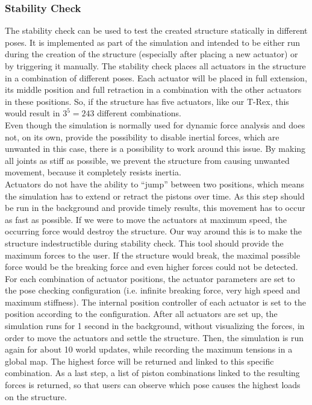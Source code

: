 \subsubsection{Stability Check}
The stability check can be used to test the created structure statically in different poses. It is implemented as part of the simulation and intended to be either run during the creation of the structure (especially after placing a new actuator) or by triggering it manually. The stability check places all actuators in the structure in a combination of different poses. Each actuator will be placed in full extension, its middle position and full retraction in a combination with the other actuators in these positions. So, if the structure has five actuators, like our T-Rex, this would result in $3 ^ 5 = 243$ different combinations.\\
Even though the simulation is normally used for dynamic force analysis and does not, on its own, provide the possibility to disable inertial forces, which are unwanted in this case, there is a possibility to work around this issue. By making all joints as stiff as possible, we prevent the structure from causing unwanted movement, because it completely resists inertia.\\
Actuators do not have the ability to ``jump'' between two positions, which means the simulation has to extend or retract the pistons over time. As this step should be run in the background and provide timely results, this movement has to occur as fast as possible. If we were to move the actuators at maximum speed, the occurring force would destroy the structure. Our way around this is to make the structure indestructible during stability check. This tool should provide the maximum forces to the user. If the structure would break, the maximal possible force would be the breaking force and even higher forces could not be detected.\\
For each combination of actuator positions, the actuator parameters are set to the pose checking configuration (i.e. infinite breaking force, very high speed and maximum stiffness). The internal position controller of each actuator is set to the position according to the configuration. After all actuators are set up, the simulation runs for 1 second in the background, without visualizing the forces, in order to move the actuators and settle the structure. Then, the simulation is run again for about 10 world updates, while recording the maximum tensions in a global map. The highest force will be returned and linked to this specific combination. As a last step, a list of piston combinations linked to the resulting forces is returned, so that users can observe which pose causes the highest loads on the structure.


